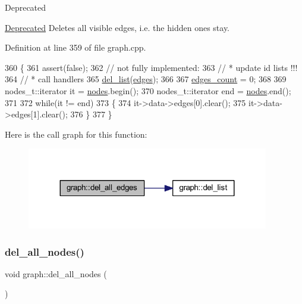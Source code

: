 \begin{DoxyRefDesc}{Deprecated}
\item[\mbox{\hyperlink{deprecated__deprecated000002}{Deprecated}}]Deletes all visible edges, i.\+e. the hidden ones stay. \end{DoxyRefDesc}


Definition at line 359 of file graph.\+cpp.


\begin{DoxyCode}
360 \{
361     assert(\textcolor{keyword}{false});
362     \textcolor{comment}{// not fully implemented:}
363     \textcolor{comment}{//  * update id lists !!!}
364     \textcolor{comment}{//  * call handlers}
365     \mbox{\hyperlink{classgraph_a23f0a5fb311b7d71bb9dfc4e8aedef35}{del\_list}}(\mbox{\hyperlink{classgraph_ab5b1c610cca1bcf72b05aacc28a48153}{edges}});
366 
367     \mbox{\hyperlink{classgraph_af560ff4263ad165c166a46084e781b4a}{edges\_count}} = 0;
368     
369     nodes\_t::iterator it = \mbox{\hyperlink{classgraph_a4ea0592e8eb7c26c5abad24546907726}{nodes}}.begin();
370     nodes\_t::iterator end = \mbox{\hyperlink{classgraph_a4ea0592e8eb7c26c5abad24546907726}{nodes}}.end();
371 
372     \textcolor{keywordflow}{while}(it != end)
373     \{
374     it->data->edges[0].clear();
375     it->data->edges[1].clear();
376     \}
377 \}
\end{DoxyCode}
Here is the call graph for this function\+:
\nopagebreak
\begin{figure}[H]
\begin{center}
\leavevmode
\includegraphics[width=299pt]{classgraph_aae52be443c5aef001b5f6758855f15ad_cgraph}
\end{center}
\end{figure}
\mbox{\label{classgraph_ad0ca1578643a51f96a76a846f14558df}} 
\subsubsection{\texorpdfstring{del\+\_\+all\+\_\+nodes()}{del\_all\_nodes()}}
{\footnotesize\ttfamily void graph\+::del\+\_\+all\+\_\+nodes (\begin{DoxyParamCaption}{ }\end{DoxyParamCaption})\hspace{0.3cm}{\ttfamily [inherited]}}

